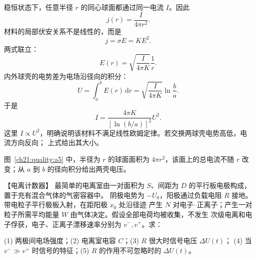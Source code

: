 {\begin{xesolution}
\par\noindent\begin{minipage}{\linewidth}
\conductingShellFigure
{}
\end{minipage}\par\medskip


稳恒状态下，任意半径 $r$ 的同心球面都通过同一电流 $I$。因此
\[
  j(r)=\frac{I}{4\pi r^2}.
\]
材料的局部伏安关系不是线性的，而是
\[
  j=\sigma E=KE^2.
\]
两式联立：
\[
  E(r)=\sqrt{\frac{I}{4\pi K}}\frac1r.
\]
内外球壳的电势差为电场沿径向的积分：
\[
  U=\int_a^bE(r)\,\mathrm dr
  =\sqrt{\frac{I}{4\pi K}}\ln\frac ba.
\]
于是
\[
  \boxed{I=\frac{4\pi K}{[\ln(b/a)]^2}U^2}.
\]
这里 $I\propto U^2$，明确说明该材料不满足线性欧姆定律。若交换两球壳电势高低，电流方向反向；
上式给出其大小。

图~\ref{ch21:quality:a5} 中，半径为 $r$ 的球面面积为 $4\pi r^2$，该面上的总电流不随 $r$ 改变；从 $a$ 到 $b$ 的径向积分给出两壳电压。
\end{xesolution}



\begin{origexamplebox}{【电离计数器】}\label{ch21:ex:s36-5-6}
最简单的电离室由一对面积为 $S$、间距为 $D$ 的平行板电极构成，置于充有混合气体的气密容器中。
阴极电势为 $-U_0$，阳极通过负载电阻 $R$ 接地。带电粒子平行极板入射，在距阳极 $x_0$ 处沿径迹
产生 $N$ 对电子--正离子；产生一对粒子所需平均能量 $W$ 由气体决定。假设全部电荷均被收集，不发生
次级电离和电子俘获，电子、正离子漂移速率分别为 $v^-,v^+$。求：

(1) 两极间电场强度；(2) 电离室电容 $C$；(3) $R$ 很大时信号电压 $\Delta U(t)$；
(4) 当 $v^-\gg v^+$ 时信号的特征；(5) $R$ 的作用不可忽略时的 $\Delta U(t)$。
\par\noindent\begin{minipage}{\linewidth}
\emIonChamberQuestion
{}
\end{minipage}\par\medskip
\end{origexamplebox}
\par\pagebreak[0]
\begin{xesolution}

\par\noindent\begin{minipage}{\linewidth}
\ionChamberFigure
{}
\end{minipage}\par\medskip



\end{xesolution}}

